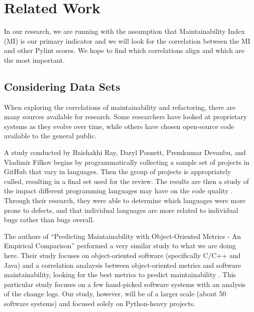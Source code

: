 
\section{Related Work} \label{sectionRelatedWork}

In our research, we are running with the assumption that Maintainability Index (MI) is our primary indicator and we will look for the correlation between the MI and other Pylint scores. We hope to find which correlations align and which are the most important.

\subsection{Considering Data Sets}

When exploring the correlations of maintainability and refactoring, there are many sources available for research. Some researchers have looked at proprietary systems as they evolve over time, while others have chosen open-source code available to the general public.

A study conducted by Baishakhi Ray, Daryl Posnett, Premkumar Devanbu, and Vladimir Filkov begins by programmatically collecting a sample set of projects in GitHub that vary in languages. Then the group of projects is appropriately culled, resulting in a final set used for the review. The results are then a study of the impact different programming languages may have on the code quality \cite{baishakhi:2017}. Through their research, they were able to determine which languages were more prone to defects, and that individual languages are more related to individual bugs rather than bugs overall.

The authors of ``Predicting Maintainability with Object-Oriented Metrics - An Empirical Comparison'' performed a very similar study to what we are doing here. Their study focuses on object-oriented software (specifically C/C++ and Java) and a correlation analaysis between object-oriented metrics and software maintainability, looking for the best metrics to predict maintainability \cite{janke:2003}. This particular study focuses on a few hand-picked software systems with an analysis of the change logs. Our study, however, will be of a larger scale (about 50 software systems) and focused solely on Python-heavy projects.

